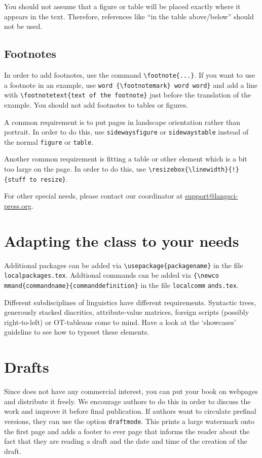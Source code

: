 You should not assume that a figure or table will be placed exactly where it appears in the text. Therefore, references like ``in the table above/below'' should not be used. 

\subsection{Footnotes}
In order to add footnotes, use the command \verb+\footnote{...}+. If you want to use a footnote in an example, use \verb+word {\footnotemark} word word}+ and add a line with \verb+\footnotetext{text of the footnote}+ just before the translation of the example. You should not add footnotes to tables or figures.


A common requirement is to put pages in landscape orientation rather than portrait. In order to do this, use \verb+sidewaysfigure+ or \verb+sidewaystable+ instead of the normal \verb+figure+ or \verb+table+.

Another common requirement is fitting a table or other element which is a bit too large on the page. In order to do this, use \verb+\resizebox{\linewidth}{!}+ \verb+{stuff to resize}+.

For other special needs, please contact our coordinator at \url{support@langsci-press.org}. 

\section{Adapting the class to your needs}

Additional packages can be added via \verb+\usepackage{packagename}+ in the file \verb+localpackages.tex+.
Addtional commands can be added via \verb+{\newco+ \verb+mmand{commandname}{commanddefinition}+ in the file \verb+localcomm+ \verb+ands.tex+. 


Different subdisciplines of linguistics have different requirements. Syntactic trees, generously stacked diacritics, attribute-value matrices, foreign scripts (possibly right-to-left) or OT-tableaus come to mind. Have a look at the `showcases' guideline to see how to typeset these elements.


 
   
\section{Drafts}

Since \lsp does not have any commercial interest, you can put your book on webpages and distribute it
freely. We encourage authors to do this in order to discuss the work and improve it before final
publication. If authors want to circulate prefinal versions, they can use the option
\texttt{draftmode}. This prints a large watermark onto the first page and adds a footer to ever page
that informs the reader about the fact that they are reading a draft and the date and time of the
creation of the draft.
  